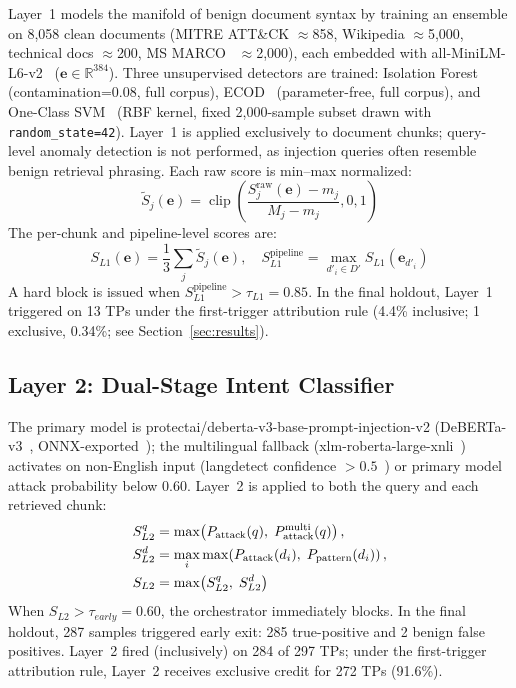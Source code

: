 ﻿\documentclass[conference]{IEEEtran}
\begin{document}
Layer~1 models the manifold of benign document syntax by training an ensemble
on 8,058 clean documents (MITRE ATT\&CK $\approx$858, Wikipedia
$\approx$5,000, technical docs $\approx$200,
MS MARCO~\cite{bajaj2016} $\approx$2,000), each embedded with
all-MiniLM-L6-v2~\cite{allminilm2021,reimers2019}
($\mathbf{e} \in \mathbb{R}^{384}$).
Three unsupervised detectors are trained: Isolation Forest~\cite{liu2008}
(contamination=0.08, full corpus), ECOD~\cite{li2023} (parameter-free, full
corpus), and One-Class SVM~\cite{scholkopf2000} (RBF kernel, fixed
2,000-sample subset drawn with \texttt{random\_state=42}).
Layer~1 is applied exclusively to document chunks; query-level anomaly
detection is not performed, as injection queries often resemble benign
retrieval phrasing.
Each raw score is min--max normalized:
\begin{equation}
\tilde{S}_j(\mathbf{e}) =
\operatorname{clip}\!\left(
\frac{S_j^{\mathrm{raw}}(\mathbf{e}) - m_j}{M_j - m_j},0,1
\right)
\end{equation}
The per-chunk and pipeline-level scores are:
\begin{equation}
S_{L1}(\mathbf{e}) =
\frac{1}{3}\!\sum_{j}\tilde{S}_j(\mathbf{e}), \quad
S_{L1}^{\text{pipeline}} = \max_{d'_i \in D'} S_{L1}(\mathbf{e}_{d'_i})
\end{equation}
A hard block is issued when
$S_{L1}^{\text{pipeline}} > \tau_{L1} = 0.85$.
In the final holdout, Layer~1 triggered on 13 TPs under the first-trigger
attribution rule (4.4\% inclusive; 1 exclusive, 0.34\%; see
Section~\ref{sec:results}).

\subsection{Layer 2: Dual-Stage Intent Classifier}

The primary model is protectai/deberta-v3-base-prompt-injection-v2
(DeBERTa-v3~\cite{he2023}, ONNX-exported~\cite{onnxruntime2022}); the
multilingual fallback (xlm-roberta-large-xnli~\cite{conneau2020}) activates
on non-English input (langdetect confidence $>0.5$~\cite{langdetect2014})
or primary model attack probability below 0.60.
Layer~2 is applied to both the query and each retrieved chunk:
\begin{align}
S_{L2}^{q} &= \max\!\left(P_{\mathrm{attack}}(q),\;
  P_{\mathrm{attack}}^{\mathrm{multi}}(q)\right), \notag\\
S_{L2}^{d} &= \max_i \max\!\left(P_{\mathrm{attack}}(d_i),\;
  P_{\mathrm{pattern}}(d_i)\right), \notag\\
S_{L2}     &= \max\!\left(S_{L2}^{q},\; S_{L2}^{d}\right)
\end{align}
When $S_{L2} > \tau_{early} = 0.60$, the orchestrator immediately blocks.
In the final holdout, 287 samples triggered early exit: 285 true-positive
and 2 benign false positives.
Layer~2 fired (inclusively) on 284 of 297 TPs; under the first-trigger
attribution rule, Layer~2 receives exclusive credit for 272 TPs (91.6\%).
\end{document}
